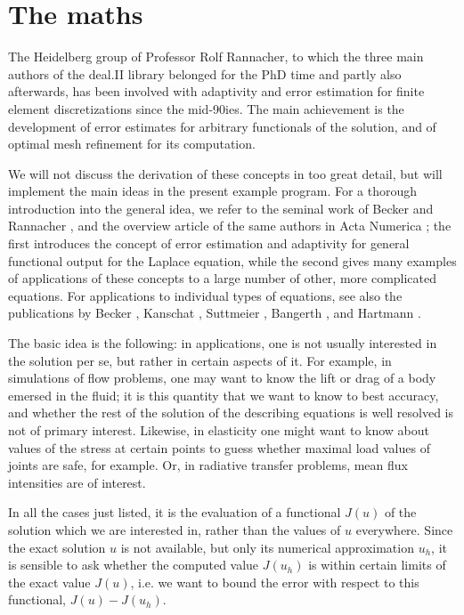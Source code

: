 \documentclass{article}
\begin{document}
\section{The maths}

The Heidelberg group of Professor Rolf Rannacher, to which the three main
authors of the deal.II library belonged for the PhD time and partly also
afterwards, has been involved with adaptivity and error estimation for finite
element discretizations since the mid-90ies. The main achievement is the
development of error estimates for arbitrary functionals of the solution, and
of optimal mesh refinement for its computation.

We will not discuss the derivation of these concepts in too great detail, but
will implement the main ideas in the present example program. For a thorough
introduction into the general idea, we refer to the seminal work of Becker and
Rannacher \cite{BR95,BR96r}, and the overview article of the same authors in
Acta Numerica \cite{BR01}; the first introduces the concept of error
estimation and adaptivity for general functional output for the Laplace
equation, while the second gives many examples of applications of these
concepts to a large number of other, more complicated equations. For
applications to individual types of equations, see also the publications by
Becker \cite{Bec95,Bec98}, Kanschat \cite{Kan96,FK97}, Suttmeier
\cite{Sut96,RS97,RS98c,RS99}, Bangerth \cite{BR99b,Ban00w,BR01a,Ban02}, and
Hartmann \cite{HH01,HH01a,HH01b}.

The basic idea is the following: in applications, one is not usually
interested in the solution per se, but rather in certain aspects of it. For
example, in simulations of flow problems, one may want to know the lift or
drag of a body emersed in the fluid; it is this quantity that we want to know
to best accuracy, and whether the rest of the solution of the describing
equations is well resolved is not of primary interest. Likewise, in elasticity
one might want to know about values of the stress at certain points to guess
whether maximal load values of joints are safe, for example. Or, in radiative
transfer problems, mean flux intensities are of interest.

In all the cases just listed, it is the evaluation of a functional $J(u)$ of
the solution which we are interested in, rather than the values of $u$
everywhere. Since the exact solution $u$ is not available, but only its
numerical approximation $u_h$, it is sensible to ask whether the computed
value $J(u_h)$ is within certain limits of the exact value $J(u)$, i.e. we
want to bound the error with respect to this functional, $J(u)-J(u_h)$.
\end{document}
